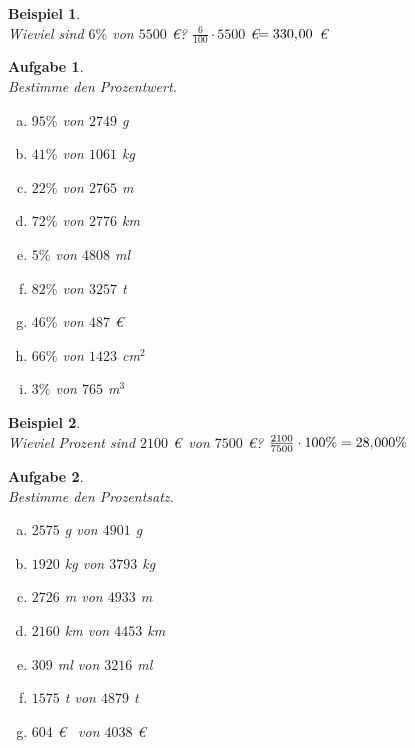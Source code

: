 \documentclass[12pt,fleqn]{article}
\theoremstyle{aufg}
\newtheorem{aufgabe}{Aufgabe}
\theoremstyle{bsp}
\newtheorem{beispiel}{Beispiel}
\begin{document}
 
    \begin{flushleft}
\begin{center}\end{center}\begin{beispiel} ~ \\ 
Wieviel sind $6\%$ von $5500$ \euro? $\frac{6}{100}\cdot 5500$ \euro $ = 330,\hspace{-1pt}00$ \euro\end{beispiel} 
\begin{aufgabe} ~ \\ 
Bestimme den Prozentwert.\begin{multicols}{3} 
\begin{enumerate}[a)] 
\item 
$95\%$ von $2749$ g
\item 
$41\%$ von $1061$ kg
\item 
$22\%$ von $2765$ m
\item 
$72\%$ von $2776$ km
\item 
$5\%$ von $4808$ ml
\item 
$82\%$ von $3257$ t
\item 
$46\%$ von $487$ \euro~
\item 
$66\%$ von $1423$ cm$^2$
\item 
$3\%$ von $765$ m$^3$
\end{enumerate} 
\end{multicols} 
\end{aufgabe} 
\begin{beispiel} ~ \\ 
Wieviel Prozent sind $2100$ \euro~von $7500$ \euro? $\frac{2100}{7500}\cdot 100\%  = 28,\hspace{-1pt}000\%$ \end{beispiel} 
\begin{aufgabe} ~ \\ 
Bestimme den Prozentsatz.\begin{multicols}{3} 
\begin{enumerate}[a)] 
\item 
$2575$ g von $4901$ g
\item 
$1920$ kg von $3793$ kg
\item 
$2726$ m von $4933$ m
\item 
$2160$ km von $4453$ km
\item 
$309$ ml von $3216$ ml
\item 
$1575$ t von $4879$ t
\item 
$604$ \euro~ von $4038$ \euro~

\end{enumerate}
\end{multicols}
\end{aufgabe}
\end{flushleft}
\end{document}
